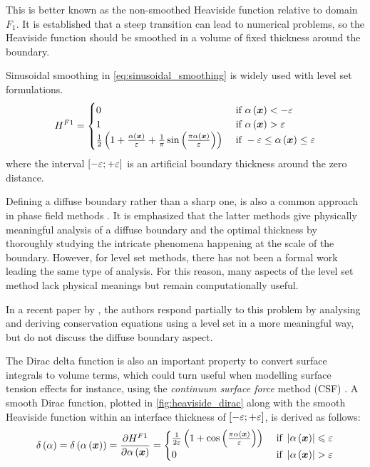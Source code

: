 This is better known as the non-smoothed Heaviside function relative to domain $F_1$.
It is established that a steep transition can lead to numerical problems, 
so the Heaviside function should be smoothed in a volume of fixed thickness around the boundary.

Sinusoidal smoothing in \cref{eq:sinusoidal_smoothing} is widely used with level set formulations.
\begin{align}
\label{eq:sinusoidal_smoothing}
H^{F1} =
\begin{cases}
	0  & \text{ if } \alpha \left( \boldsymbol{x} \right) < -\varepsilon \\
    1  & \text{ if } \alpha \left( \boldsymbol{x} \right) > \varepsilon \\  
    \frac{1}{2} \left( 1+ \frac{\alpha \left( \boldsymbol{x} \right)}{\varepsilon} 
    + \frac{1}{\pi}\sin \left( \frac{\pi \alpha \left( \boldsymbol{x} \right)}{\varepsilon } \right)  \right) & \text{ if } - \varepsilon \leq \alpha \left( \boldsymbol{x} \right) \leq \varepsilon
\end{cases}
\end{align}
where the interval $\left[ -\varepsilon; +\varepsilon \right]$ is an artificial boundary thickness around the zero distance.

Defining a diffuse boundary rather than a sharp one, is also a common approach 
in phase field methods \citep{beckermann_modeling_1999,sun_diffuse_2004}.
It is emphasized that the latter methods give physically meaningful 
analysis of a diffuse boundary and the optimal thickness by thoroughly studying the 
intricate phenomena happening at the scale of the boundary. However, for level set methods, 
there has not been a formal work leading the same type of analysis. For this reason, 
many aspects of the level set method lack physical meanings but remain computationally useful.

In a recent paper by \citet{gada_derivation_2009}, the authors respond partially to this problem 
by analysing and deriving conservation equations using a level set in a more meaningful way, but 
do not discuss the diffuse boundary aspect.

The Dirac delta function is also an important property to convert surface integrals to volume terms, which could
turn useful when modelling surface tension effects for instance, using 
the \emph{continuum surface force} method (CSF) \citep{brackbill_continuum_1992}.
A smooth Dirac function, plotted in \cref{fig:heaviside_dirac} along with the smooth Heaviside function within an interface thickness 
of $\left[ -\varepsilon;+\varepsilon \right]$, is derived as follows:
\begin{align}
\label{eq:dirac}
\delta \left( \alpha \right) = \delta \left( \alpha \left( \boldsymbol{x} \right) \right) = \frac{\partial H^{F1}  }{\partial \alpha \left( \boldsymbol{x} \right)}=
\begin{cases}
\frac{1}{2\varepsilon} \left(  1 + \cos \left( \frac{\pi \alpha \left( \boldsymbol{x} \right)}{\varepsilon } \right)  \right)  & \text{ if } \left | \alpha \left( \boldsymbol{x} \right) \right | \leqslant  \varepsilon \\
    0  & \text{ if } \left | \alpha \left( \boldsymbol{x} \right) \right | > \varepsilon
\end{cases}
\end{align}

